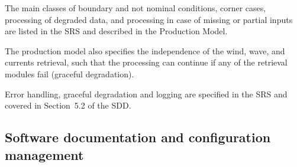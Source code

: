 
%

The main classes of boundary and not nominal conditions, corner cases, processing of degraded data, and processing in case of missing or partial inputs are listed in the SRS and described in the Production Model.

The production model also specifies the independence of the wind, wave, and currents retrieval, such that the processing can continue if any of the retrieval modules fail (graceful degradation).

Error handling, graceful degradation and logging are specified in the SRS and covered in Section~5.2 of the SDD.

\subsection{Software documentation and configuration management}
\label{subsec:doc-conf-management}


